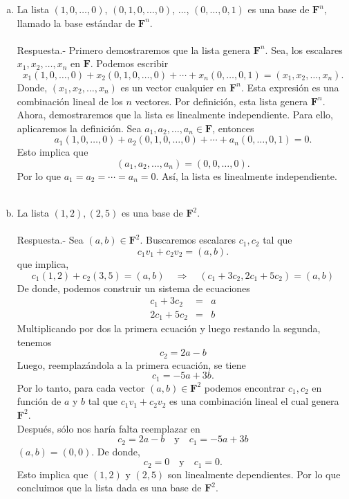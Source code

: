 \begin{enumerate}[\bfseries 1.]
\begin{enumerate}[(a)]
	    \item La lista $(1,0,\ldots,0)$, $(0,1,0,\ldots,0)$, $\ldots$, $(0,\ldots,0,1)$ es una base de $\textbf{F}^n$, llamado la base estándar de $\textbf{F}^n$.\\\\
		Respuesta.-\; Primero demostraremos que la lista genera $\textbf{F}^n$.  Sea, los escalares $x_1,x_2,\ldots,x_n$ en $\textbf{F}$. Podemos escribir
		$$x_1(1,0,\ldots,0)+x_2(0,1,0,\ldots,0)+\cdots+x_n(0,\ldots,0,1)=\left(x_1,x_2,\ldots,x_n\right).$$
		Donde, $(x_1,x_2,\ldots,x_n)$ es un vector cualquier en $\textbf{F}^n$. Esta expresión es una combinación lineal de los $n$ vectores. Por definición, esta lista genera $\textbf{F}^n$.\\
		Ahora, demostraremos que la lista es linealmente independiente. Para ello, aplicaremos la definición. Sea $a_1,a_2,\ldots,a_n\in \textbf{F}$, entonces
		$$a_1(1,0,\ldots,0)+a_2(0,1,0,\ldots,0)+\cdots+a_n(0,\ldots,0,1)=0.$$
		Esto implica que
		$$(a_1,a_2,\ldots,a_n)=(0,0,\ldots,0).$$
		Por lo que $a_1=a_2=\cdots=a_n=0$. Así, la lista es linealmente independiente.\\\\

	    \item  La lista $(1,2),(2,5)$ es una base de $\textbf{F}^2$.\\\\
		Respuesta.-\; Sea $(a,b)\in \textbf{F}^2$. Buscaremos escalares $c_1,c_2$ tal que
		$$c_1v_1+c_2v_2=(a,b).$$
		que implica,
		$$c_1(1,2)+c_2(3,5)=(a,b)\quad \Rightarrow \quad (c_1+3c_2,2c_1+5c_2)=(a,b)$$
		De donde, podemos construir un sistema de ecuaciones
		$$
		\begin{array}{rcl}
		    c_1+3c_2&=&a\\
		    2c_1+5c_2&=&b
		\end{array}
		$$
		Multiplicando por dos la primera ecuación y luego restando la segunda, tenemos
		$$c_2=2a-b$$
		Luego, reemplazándola a la primera ecuación, se tiene
		$$c_1=-5a+3b.$$
		Por lo tanto, para cada vector $(a,b)\in \textbf{F}^2$ podemos encontrar $c_1,c_2$ en función de $a$ y $b$ tal que $c_1v_1+c_2v_2$ es una combinación lineal el cual genera $\textbf{F}^2$.\\
		Después, sólo nos haría falta reemplazar en
		$$c_2=2a-b\quad \mbox{y}\quad c_1=-5a+3b$$
		$(a,b)=(0,0)$. De donde,
		$$c_2=0\quad \mbox{y}\quad c_1=0.$$
		Esto implica que $(1,2)$ y $(2,5)$ son linealmente dependientes. Por lo que concluimos que la lista dada es una base de $\textbf{F}^2$.\\\\


\end{enumerate}
\end{enumerate}
